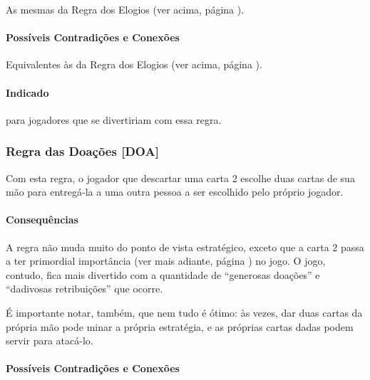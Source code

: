 As mesmas da Regra dos Elogios (ver acima, página \pageref{elogios}).

\paragraph{Possíveis Contradições e Conexões}

Equivalentes às da Regra dos Elogios (ver acima, página \pageref{elogios}).

\paragraph{Indicado}

para jogadores que se divertiriam com essa regra.

\subsubsection{Regra das Doações [DOA]}

Com esta regra, o jogador que descartar uma carta 2 escolhe duas cartas de sua mão para entregá-la a uma outra pessoa a ser escolhido pelo próprio jogador.

\paragraph{Consequências}

A regra não muda muito do ponto de vista estratégico, exceto que a carta 2 passa a ter primordial importância (ver mais adiante, página \pageref{armas}) no jogo. O jogo, contudo, fica mais divertido com a quantidade de ``generosas doações'' e ``dadivosas retribuições'' que ocorre.

É importante notar, também, que nem tudo é ótimo: às vezes, dar duas cartas da própria mão pode minar a própria estratégia, e as próprias cartas dadas podem servir para atacá-lo.

\paragraph{Possíveis Contradições e Conexões}

